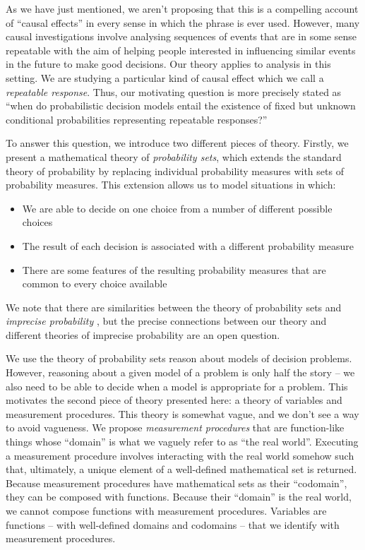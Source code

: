\documentclass{article}
\theoremstyle{plain}
\theoremstyle{definition}
\begin{document}
As we have just mentioned, we aren't proposing that this is a compelling account of ``causal effects'' in every sense in which the phrase is ever used. However, many causal investigations involve analysing sequences of events that are in some sense repeatable with the aim of helping people interested in influencing similar events in the future to make good decisions. Our theory applies to analysis in this setting. We are studying a particular kind of causal effect which we call a \emph{repeatable response}. Thus, our motivating question is more precisely stated as ``when do probabilistic decision models entail the existence of fixed but unknown conditional probabilities representing repeatable responses?''

To answer this question, we introduce two different pieces of theory. Firstly, we present a mathematical theory of \emph{probability sets}, which extends the standard theory of probability by replacing individual probability measures with sets of probability measures. This extension allows us to model situations in which:
\begin{itemize}
  \item We are able to decide on one choice from a number of different possible choices
  \item The result of each decision is associated with a different probability measure
  \item There are some features of the resulting probability measures that are common to every choice available
\end{itemize}
We note that there are similarities between the theory of probability sets and \emph{imprecise probability} \citep{walley_statistical_1991}, but the precise connections between our theory and different theories of imprecise probability are an open question.

We use the theory of probability sets reason about models of decision problems. However, reasoning about a given model of a problem is only half the story -- we also need to be able to decide when a model is appropriate for a problem. This motivates the second piece of theory presented here: a theory of variables and measurement procedures. This theory is somewhat vague, and we don't see a way to avoid vagueness. We propose \emph{measurement procedures} that are function-like things whose ``domain'' is what we vaguely refer to as ``the real world''. Executing a measurement procedure involves interacting with the real world somehow such that, ultimately, a unique element of a well-defined mathematical set is returned. Because measurement procedures have mathematical sets as their ``codomain'', they can be composed with functions. Because their ``domain'' is the real world, we cannot compose functions with measurement procedures. Variables are functions -- with well-defined domains and codomains -- that we identify with measurement procedures. 
\end{document}
